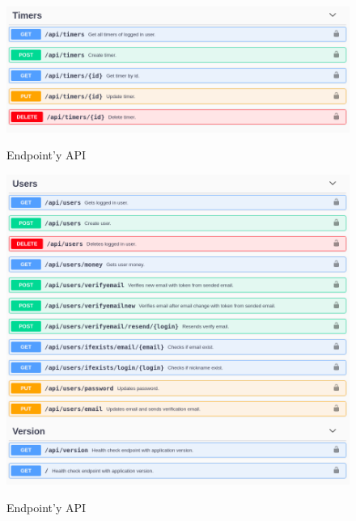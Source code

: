 \documentclass[a4paper,11pt]{report}
\begin{document}
\begin{figure}[H]
	\centering
	\includegraphics[scale=0.4]{implementacja/backend/timers_api}\\
	\caption{Endpoint'y API}
	\label{fig:timers_api}
\end{figure}
\begin{figure}[H]
	\centering
	\includegraphics[scale=0.4]{implementacja/backend/users_api}\\
	\caption{Endpoint'y API}
	\label{fig:users_api}
\end{figure}
\end{document}

